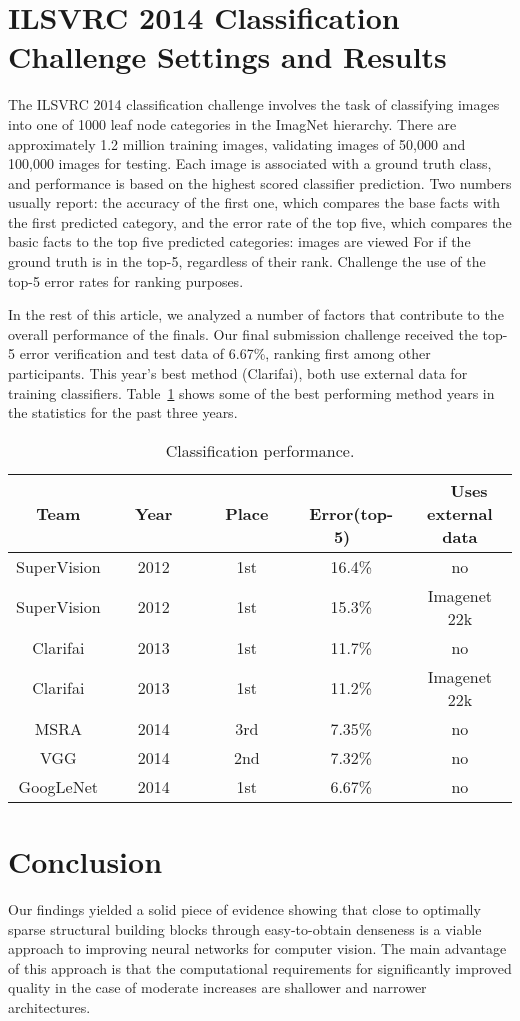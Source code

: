 \documentclass[10pt,twocolumn,letterpaper]{article}
\begin{document}
\section{ILSVRC 2014 Classification Challenge Settings and Results}
The ILSVRC 2014 classification challenge involves the task of classifying images into one of 1000 leaf node categories in the ImagNet hierarchy. There are approximately 1.2 million training images, validating images of 50,000 and 100,000 images for testing. Each image is associated with a ground truth class, and performance is based on the highest scored classifier prediction. Two numbers usually report: the accuracy of the first one, which compares the base facts with the first predicted category, and the error rate of the top five, which compares the basic facts to the top five predicted categories: images are viewed For if the ground truth is in the top-5, regardless of their rank. Challenge the use of the top-5 error rates for ranking purposes.
\par In the rest of this article, we analyzed a number of factors that contribute to the overall performance of the finals. Our final submission challenge received the top-5 error verification and test data of 6.67\%, ranking first among other participants. This year's best method (Clarifai), both use external data for training classifiers. Table~\ref{table1} shows some of the best performing method years in the statistics for the past three years.
\begin{table}[tp]%
	\centering 
	\caption{Classification performance.}\label{table1}
	\tabcolsep 0.0001in 
	\begin{tabular} {|c|c|c|c|c|}
		\hline
		Team &~~Year~~& ~~Place~~&~~ Error(top-5)~~&~~Uses external data\\
		\hline\hline
		SuperVision &2012& 1st& 16.4\%& no\\
		\hline
		SuperVision& 2012& 1st &15.3\% &Imagenet 22k\\
		\hline
		Clarifai &2013& 1st &11.7\% &no\\
		\hline
		Clarifai& 2013& 1st &11.2\%& Imagenet 22k\\
		\hline
		MSRA &2014 &3rd& 7.35\% &no\\
		\hline
		VGG& 2014 &2nd &7.32\% &no \\
		\hline
		GoogLeNet& 2014 &1st &6.67\% &no
\\
		\hline
	\end{tabular}
\end{table}
\section{Conclusion}
Our findings yielded a solid piece of evidence showing that close to optimally sparse structural building blocks through easy-to-obtain denseness is a viable approach to improving neural networks for computer vision. The main advantage of this approach is that the computational requirements for significantly improved quality in the case of moderate increases are shallower and narrower architectures.


{\small
	
	} 
\end{document}

